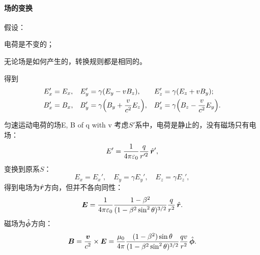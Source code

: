 \paragraph{场的变换}
假设：
\begin{compactenum}
	\item 电荷是不变的；
	\item 无论场是如何产生的，转换规则都是相同的。
\end{compactenum}
得到
\begin{align}
    E_x'&=E_x,&E_y'&=\gamma(E_y-vB_z),&E_z'&=\gamma(E_z+vB_y);\\
    B_x'&=B_x,&B_y'&=\gamma\Bigl(B_y+\frac v{c^2}E_z\Bigr),&B_z'&=\gamma\Bigl(B_z-\frac v{c^2}E_y\Bigr).
\end{align}
\begin{example}{匀速运动电荷的场}{E, B of q with v}
    考虑$S'$系中，电荷是静止的，没有磁场只有电场：
    \[
        E'=\frac1{4\pi\varepsilon_0}\frac q{r'^2}\mathop{}\!\hat{\bm{r}}',
    \]
    变换到原系$S$：
    \[
        E_x=E_x',\quad E_y=\gamma E_y',\quad E_z=\gamma E_z',
    \]
    得到电场为$\mathop{}\!\hat{\bm{r}}$方向，但并不各向同性：
    \begin{equation}
        \bm E=\frac1{4\pi\varepsilon_0}\frac{1-\beta^2}{(1-\beta^2\sin^2\theta)^{3/2}}\frac q{r^2}\mathop{}\!\hat{\bm{r}}.
    \end{equation}
    磁场为$\mathop{}\!\hat{\bm{\phi}}$方向：
    \begin{equation}
        \bm B=\frac{\bm v}{c^2}\times\bm E=\frac{\mu_0}{4\pi}\frac{(1-\beta^2)\sin\theta}{(1-\beta^2\sin^2\theta)^{3/2}}\frac{qv}{r^2}\mathop{}\!\hat{\bm{\phi}}.
    \end{equation}
\end{example}
